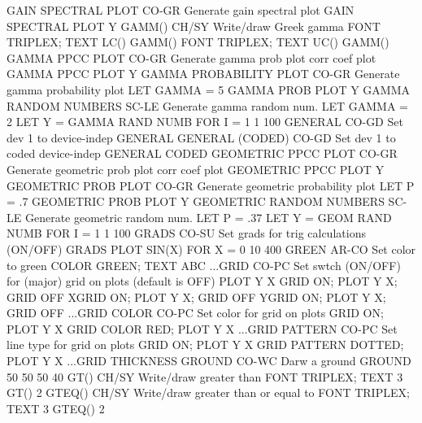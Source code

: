 GAIN SPECTRAL PLOT          CO-GR Generate gain spectral plot
                                  GAIN SPECTRAL PLOT Y
GAMM()                      CH/SY Write/draw Greek gamma
                                  FONT TRIPLEX; TEXT LC() GAMM()
                                  FONT TRIPLEX; TEXT UC() GAMM()
GAMMA PPCC PLOT             CO-GR Generate gamma prob plot corr coef plot
                                  GAMMA PPCC PLOT Y
GAMMA PROBABILITY PLOT      CO-GR Generate gamma probability plot
                                  LET GAMMA = 5
                                  GAMMA PROB PLOT Y
GAMMA RANDOM NUMBERS        SC-LE Generate gamma random num.
                                  LET GAMMA = 2
                                  LET Y = GAMMA RAND NUMB FOR I = 1 1 100
GENERAL                     CO-GD Set dev 1 to device-indep
                                  GENERAL
GENERAL (CODED)             CO-GD Set dev 1 to coded device-indep
                                  GENERAL CODED
GEOMETRIC PPCC PLOT         CO-GR Generate geometric prob plot corr coef plot
                                  GEOMETRIC PPCC PLOT Y
GEOMETRIC PROB PLOT         CO-GR Generate geometric probability plot
                                  LET P = .7
                                  GEOMETRIC PROB PLOT Y
GEOMETRIC RANDOM NUMBERS    SC-LE Generate geometric random num.
                                  LET P = .37
                                  LET Y = GEOM RAND NUMB FOR I = 1 1 100
GRADS                       CO-SU Set grads for trig calculations (ON/OFF)
                                  GRADS
                                  PLOT SIN(X) FOR X = 0 10 400
GREEN                       AR-CO Set color to green
                                  COLOR GREEN; TEXT ABC
...GRID                     CO-PC Set swtch (ON/OFF) for (major) grid on plots
                                  (default is OFF)
                                  PLOT Y X
                                  GRID ON; PLOT Y X; GRID OFF
                                  XGRID ON; PLOT Y X; GRID OFF
                                  YGRID ON; PLOT Y X; GRID OFF
...GRID COLOR                  CO-PC Set color for grid on plots
                                  GRID ON; PLOT Y X
                                  GRID COLOR RED; PLOT Y X
...GRID PATTERN                CO-PC Set line type for grid on plots
                                  GRID ON; PLOT Y X
                                  GRID PATTERN DOTTED; PLOT Y X
...GRID THICKNESS
GROUND                      CO-WC Darw a ground
                                  GROUND 50 50 50 40
GT()                        CH/SY Write/draw greater than
                                  FONT TRIPLEX; TEXT 3 GT() 2
GTEQ()                      CH/SY Write/draw greater than or equal to
                                  FONT TRIPLEX; TEXT 3 GTEQ() 2
 

